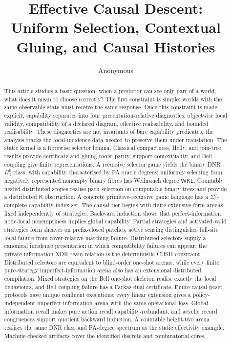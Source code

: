 \documentclass[11pt]{article}
\title{Effective Causal Descent:\\ Uniform Selection, Contextual Gluing, and Causal Histories}
\author{Anonymous}
\date{}
\theoremstyle{plain}
\theoremstyle{definition}
\theoremstyle{remark}
\begin{document}
\maketitle

\begin{abstract}
This article studies a basic question: when a predictor can see only part of a
world, what does it mean to choose correctly? The first constraint is simple:
worlds with the same observable state must receive the same response. Once this
constraint is made explicit, capability separates into four
presentation-relative diagnostics: objectwise local validity, compatibility of a
declared diagram, effective realisability, and bounded realisability. These
diagnostics are not invariants of bare capability predicates; the analysis
tracks the local-incidence data needed to preserve them under translation. The
static kernel is a fibrewise selector lemma. Classical
compactness, Helly, and join-tree results provide certificate and gluing tools;
parity, support contextuality, and Bell coupling give finite representations. A
recursive selector game yields the binary DNR $\Pi^0_1$ class, with capability
characterised by PA oracle degrees; uniformly selecting from negatively
represented nonempty binary fibres has Weihrauch degree $\mathsf{WKL}$.
Countably nested distributed scopes realise path selection on computable binary
trees and provide a distributed $\mathsf K$ obstruction. A concrete
primitive-recursive game language has a $\Sigma^0_3$-complete capability index
set. The causal tier begins with finite extensive-form arenas fixed independently of
strategies. Backward induction shows that perfect-information node-local
nonemptiness implies global capability. Partial strategies and activated-valid
strategies form sheaves on prefix-closed patches; active sensing distinguishes
full-site local failure from cover-relative matching failure. Distributed
selectors supply a canonical incidence presentation in which compatibility
failures can appear; the private-information XOR team relation is the
deterministic CHSH constraint. Distributed selectors are
equivalent to blind-order one-shot arenas, while every finite pure-strategy
imperfect-information arena also has an extensional distributed compilation.
Mixed strategies on the Bell one-shot skeleton realise exactly the local
behaviours, and Bell coupling failure has a Farkas dual certificate. Finite
causal-poset protocols have unique confluent executions; every linear extension
gives a policy-independent imperfect-information arena with the same operational
loss. Global information recall makes pure action recall capability-redundant,
and acyclic record congruences support quotient backward induction. A countable
height-two arena realises the same DNR class and PA-degree spectrum as the static
effectivity example. Machine-checked artifacts cover the identified discrete and combinatorial
cores.

\end{abstract}
\end{document}
